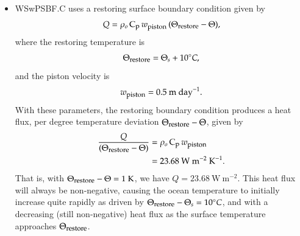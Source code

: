 \begin{itemize}
\begin{itemize}
\item {\sc WSwPSBF.C} uses a restoring surface boundary condition
  given by
\begin{equation}
 Q =  \rho_o \, \mbox{C}_{\mbox{\footnotesize p}} \, w_{\mbox{\footnotesize piston}} \, (\Theta_{\mbox{\footnotesize restore}}  - \Theta),
\label{eq:heat-flux-restoring}
\end{equation}
 where the restoring temperature is 
\begin{equation}
\Theta_{\mbox{\footnotesize restore}}  = \Theta_s + 10^{\circ}C,
\label{eq:restoring-temp}
\end{equation}
 and the piston velocity is 
\begin{equation}
  w_{\mbox{\footnotesize piston}} = 0.5~\mbox{m}~\mbox{day}^{-1}. 
\end{equation}
With these parameters, the restoring boundary condition produces a
heat flux, per degree temperature deviation
$\Theta_{\mbox{\footnotesize restore}} - \Theta$, given by
\begin{subequations}
\begin{align}
 \frac{Q}{(\Theta_{\mbox{\footnotesize restore}} - \Theta )} &= \rho_o \, \mbox{C}_{\mbox{\footnotesize p}} \, w_{\mbox{\footnotesize piston}}
 \\
 &= 23.68~\mbox{W}~\mbox{m}^{-2}~\mbox{K}^{-1}.  
\end{align}
\end{subequations}
That is, with $\Theta_{\mbox{\footnotesize restore}} - \Theta =
1~\mbox{K}$, we have $Q = 23.68~\mbox{W}~\mbox{m}^{-2}$.  This heat
flux will always be non-negative, causing the ocean temperature to
initially increase quite rapidly as driven by
$\Theta_{\mbox{\footnotesize restore}} - \Theta_s = 10^{\circ}C$, and
with a decreasing (still non-negative) heat flux as the surface
temperature approaches $\Theta_{\mbox{\footnotesize restore}}$.

\end{itemize} 

\end{itemize}


